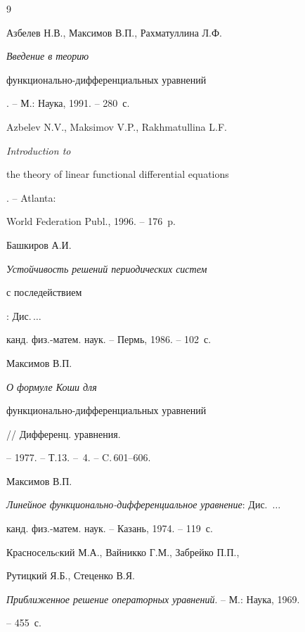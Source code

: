 \begin{thebibliography}{9}







Азбелев Н.В., Максимов В.П., Рахматуллина Л.Ф. {\em Введение в теорию


функционально-дифференциальных уравнений}. -- М.: Наука, 1991. -- 280~с.




Azbelev N.V., Maksimov V.P., Rakhmatullina L.F. {\em Introduction to


the theory of linear functional differential equations}. -- Atlanta:


World Federation Publ., 1996. -- 176~p.




Башкиров А.И. {\em Устойчивость решений периодических систем


с последействием}: Дис.\,$\dotsc$


канд. физ.-матем. наук. -- Пермь, 1986. -- 102~с.




Максимов В.П. {\em О формуле Коши для


функционально-дифференциальных уравнений} // Дифференц. уравнения.


-- 1977. -- Т.13. -- \No\,4. -- C.\,601--606.




Максимов В.П.


{\em Линейное функционально-дифференциальное уравнение}: Дис. \,$\dotsc$


канд. физ.-матем. наук. -- Казань, 1974. -- 119~с.




Красносельcкий М.А., Вайникко Г.М., Забрейко П.П.,


Рутицкий Я.Б., Стеценко В.Я.


{\em Приближенное решение операторных уравнений}. -- М.: Наука, 1969.


-- 455~с.





\end{thebibliography}





\vskip 2cm









\label{end}











